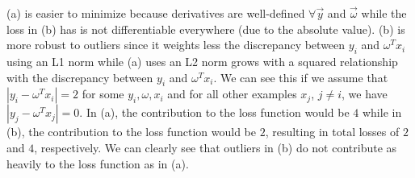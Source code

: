 (a) is easier to minimize because derivatives are well-defined $\forall \vec{y}$ and $\vec{\omega}$ while the loss in (b) has is not differentiable everywhere (due to the absolute value). (b) is more robust to outliers since it weights less the discrepancy between $y_i$ and $\omega^T x_i$ using an L1 norm while (a) uses an L2 norm grows with a squared relationship with the discrepancy between $y_i$ and $\omega^T x_i$. We can see this if we assume that $|y_i - \omega^T x_i| = 2$ for some $y_i, \omega, x_i$ and for all other examples $x_j$, $j \neq i$, we have $|y_j - \omega^T x_j| = 0$. In (a), the contribution to the loss function would be $4$ while in (b), the contribution to the loss function would be $2$, resulting in total losses of $2$ and $4$, respectively. We can clearly see that outliers in (b) do not contribute as heavily to the loss function as in (a). 